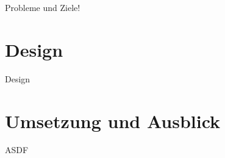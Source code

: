 \begin{frame}[fragile]{}
Probleme und Ziele!
\end{frame}

\part{Design}
\label{part:design}

\begin{frame}[fragile]{}
Design
\end{frame}

\part{Umsetzung und Ausblick}
\label{part:practice}

\begin{frame}[fragile]{}
ASDF
\end{frame}